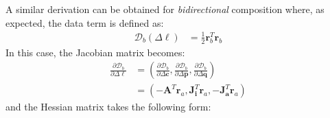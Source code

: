 A similar derivation can be obtained for \emph{bidirectional} composition where, as expected, the data term is defined as:
\begin{equation}
    \begin{aligned}
		\mathcal{D}_b(\Delta \boldsymbol{\ell}) & = \frac{1}{2}\mathbf{r}_b^T \mathbf{r}_b
    \label{eq:bidirectional_data}
    \end{aligned}
\end{equation}
In this case, the Jacobian matrix becomes:
\begin{equation}
    \begin{aligned}
		\frac{\partial \mathcal{D}_b}{\partial \Delta \boldsymbol{\ell}} & = \left( \frac{\partial \mathcal{D}_b}{\partial \Delta \mathbf{c}}, \frac{\partial \mathcal{D}_b}{\partial \Delta \mathbf{p}}, \frac{\partial \mathcal{D}_b}{\partial \Delta \mathbf{q}} \right)
		\\
		& = \left( -\mathbf{A}^T \mathbf{r}_a, \mathbf{J}_{\mathbf{i}}^T \mathbf{r}_a, -\mathbf{J}_{\mathbf{a}}^T \mathbf{r}_a \right)
    \label{eq:bidirectional_newton_jacobian}
    \end{aligned}
\end{equation}
and the Hessian matrix takes the following form:
